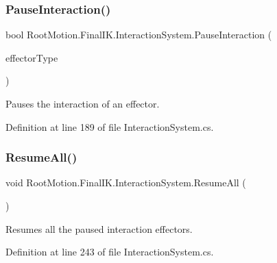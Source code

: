 \subsubsection{\texorpdfstring{Pause\+Interaction()}{PauseInteraction()}}
{\footnotesize\ttfamily bool Root\+Motion.\+Final\+I\+K.\+Interaction\+System.\+Pause\+Interaction (\begin{DoxyParamCaption}\item[{\mbox{\hyperlink{namespace_root_motion_1_1_final_i_k_ae0dd2058c7667b6f132c11a6b860c14a}{Full\+Body\+Biped\+Effector}}}]{effector\+Type }\end{DoxyParamCaption})}



Pauses the interaction of an effector. 



Definition at line 189 of file Interaction\+System.\+cs.

\mbox{\label{class_root_motion_1_1_final_i_k_1_1_interaction_system_a19f513364b351e2248196e99abb14071}} 
\subsubsection{\texorpdfstring{Resume\+All()}{ResumeAll()}}
{\footnotesize\ttfamily void Root\+Motion.\+Final\+I\+K.\+Interaction\+System.\+Resume\+All (\begin{DoxyParamCaption}{ }\end{DoxyParamCaption})}



Resumes all the paused interaction effectors. 



Definition at line 243 of file Interaction\+System.\+cs.

\mbox{\label{class_root_motion_1_1_final_i_k_1_1_interaction_system_ac201f874a5a9e7f12e648329d5f8e31a}} 
